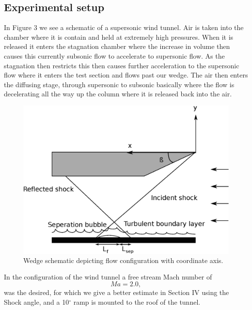 \documentclass[a4paper,10pt,twoside]{article}
\begin{document}
\begin{multicols}{2}



\section{Experimental setup}



In Figure 3 we see a schematic of a supersonic wind tunnel. Air is taken into the chamber where it is contain and held at extremely high pressures. When it is released it enters the stagnation chamber where the increase in volume then causes this currently subsonic flow to accelerate to supersonic flow. As the stagnation then restricts this then causes further acceleration to the supersonic flow where it enters the test section and flows past our wedge. The air then enters the diffusing stage, through supersonic to subsonic basically where the flow is decelerating all the way up the column where it is released back into the air. \par 



\begin{figure}[H]
    \centering
    \includegraphics[width=\linewidth]{wedgeschem.eps}
    \caption{Wedge schematic depicting flow configuration with coordinate axis.}
    \label{fig:my_label}
\end{figure}



In the configuration of the wind tunnel a free stream Mach number of
\begin{equation}
    Ma = 2.0,
\end{equation}
was the desired, for which we give a better estimate in Section IV using the Shock angle, and a 10$^{\circ}$ ramp is mounted to the roof of the tunnel. \par 




\end{multicols}
\end{document}
